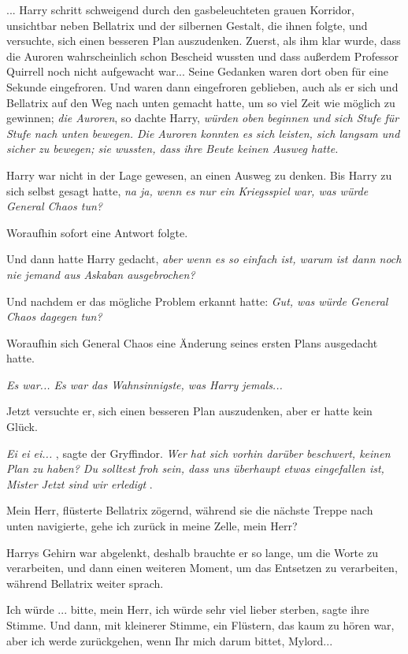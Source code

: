 ... Harry schritt schweigend durch den gasbeleuchteten grauen Korridor,
unsichtbar neben Bellatrix und der silbernen Gestalt, die ihnen folgte, und
versuchte, sich einen besseren Plan auszudenken. Zuerst, als ihm klar wurde,
dass die Auroren wahrscheinlich schon Bescheid wussten und dass außerdem
Professor Quirrell noch nicht aufgewacht war... Seine Gedanken waren dort oben
für eine Sekunde eingefroren. Und waren dann eingefroren geblieben, auch als er
sich und Bellatrix auf den Weg nach unten gemacht hatte, um so viel Zeit wie
möglich zu gewinnen; \emph{die Auroren}, so dachte Harry, \emph{würden oben
beginnen und sich Stufe für Stufe nach unten bewegen. Die Auroren konnten es
sich leisten, sich langsam und sicher zu bewegen; sie wussten, dass ihre Beute
keinen Ausweg hatte.}

Harry war nicht in der Lage gewesen, an einen Ausweg zu denken. Bis Harry zu
sich selbst gesagt hatte, \emph{na ja, wenn es nur ein Kriegsspiel war, was
würde General Chaos tun?}

Woraufhin sofort eine Antwort folgte.

Und dann hatte Harry gedacht,\emph{ aber wenn es so einfach ist, warum ist dann
noch nie jemand aus Askaban ausgebrochen?}

Und nachdem er das mögliche Problem erkannt hatte: \emph{Gut, was würde General
Chaos dagegen tun?}

Woraufhin sich General Chaos eine Änderung seines ersten Plans ausgedacht hatte.

\emph{Es war... Es war das Wahnsinnigste, was Harry jemals...}

Jetzt versuchte er, sich einen besseren Plan auszudenken, aber er hatte kein
Glück.

\emph{\glqq{}Ei ei ei...\grqq{}} , sagte der Gryffindor. \emph{Wer hat sich
vorhin darüber beschwert, keinen Plan zu haben? Du solltest froh sein, dass uns
überhaupt etwas eingefallen ist, Mister \glqq{}Jetzt sind wir erledigt\grqq{}} .

\glqq{}Mein Herr\grqq{}, flüsterte Bellatrix zögernd, während sie die nächste
Treppe nach unten navigierte, \glqq{}gehe ich zurück in meine Zelle, mein Herr?\grqq{}

Harrys Gehirn war abgelenkt, deshalb brauchte er so lange, um die Worte zu
verarbeiten, und dann einen weiteren Moment, um das Entsetzen zu verarbeiten,
während Bellatrix weiter sprach.

\glqq{}Ich würde ... bitte, mein Herr, ich würde sehr viel lieber sterben\grqq{},
sagte ihre Stimme. Und dann, mit kleinerer Stimme, ein Flüstern, das kaum zu
hören war, \glqq{}aber ich werde zurückgehen, wenn Ihr mich darum bittet,
Mylord...\grqq{}

